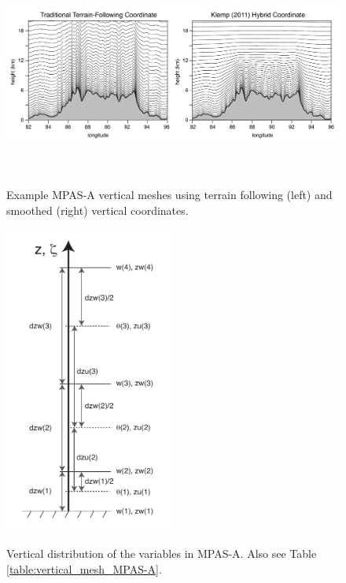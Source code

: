 \begin{figure}[t]
\begin{center}
  \noindent\includegraphics[height=2.6in,angle=0]{figures/MPAS-A_vertical_mesh.pdf}\\
  \caption{Example MPAS-A vertical meshes using terrain following (left) and smoothed (right) vertical coordinates.}
  \label{figure:vertical_mesh}
  \end{center}
\end{figure}

\begin{figure}[t]
\begin{center}
  \noindent\includegraphics[height=4in,angle=0]{figures/vertical_coordinate_mpas_a.pdf}\\
  \caption{Vertical distribution of the variables in MPAS-A. Also see Table \ref{table:vertical_mesh_MPAS-A}.}
  \label{figure:vertical_coordinate}
  \end{center}
\end{figure}




